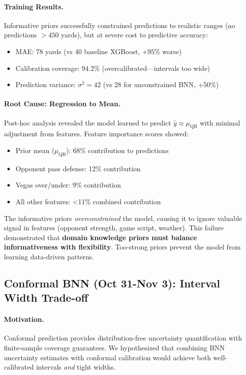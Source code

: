 \paragraph{Training Results.}
Informative priors successfully constrained predictions to realistic ranges (no predictions $> 450$ yards), but at severe cost to predictive accuracy:

\begin{itemize}[itemsep=2pt,parsep=0pt]
    \item MAE: 78 yards (vs 40 baseline XGBoost, +95\% worse)
    \item Calibration coverage: 94.2\% (overcalibrated---intervals too wide)
    \item Prediction variance: $\sigma^2 = 42$ (vs 28 for unconstrained BNN, +50\%)
\end{itemize}

\paragraph{Root Cause: Regression to Mean.}
Post-hoc analysis revealed the model learned to predict $\hat{y} \approx \mu_{\text{QB}}$ with minimal adjustment from features. Feature importance scores showed:
\begin{itemize}[itemsep=2pt,parsep=0pt]
    \item Prior mean ($\mu_{\text{QB}}$): 68\% contribution to predictions
    \item Opponent pass defense: 12\% contribution
    \item Vegas over/under: 9\% contribution
    \item All other features: <11\% combined contribution
\end{itemize}

The informative priors \textit{overconstrained} the model, causing it to ignore valuable signal in features (opponent strength, game script, weather). This failure demonstrated that \textbf{domain knowledge priors must balance informativeness with flexibility}. Too-strong priors prevent the model from learning data-driven patterns.

\subsection{Conformal BNN (Oct 31-Nov 3): Interval Width Trade-off}

\paragraph{Motivation.}
Conformal prediction provides distribution-free uncertainty quantification with finite-sample coverage guarantees. We hypothesized that combining BNN uncertainty estimates with conformal calibration would achieve both well-calibrated intervals \textit{and} tight widths.

